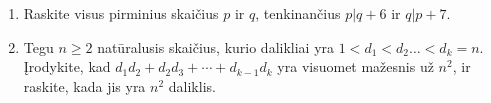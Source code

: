 \begin{enumerate}
  \item \text{[Ireland 2007]} Raskite visus pirminius skaičius $p$ ir
    $q$, tenkinančius $p|q+6$ ir $q|p+7$.
  \item \text{[IMO 2002]} Tegu $n\geq 2$ natūralusis skaičius, kurio
    dalikliai yra $1<d_1 < d_2 \dots < d_k =n$. Įrodykite, kad $d_1 d_2 +
    d_2 d_3 + \cdots + d_{k-1}d_{k}$ yra visuomet mažesnis už $n^2$, ir
    raskite, kada jis yra $n^2$ daliklis.
\end{enumerate}

